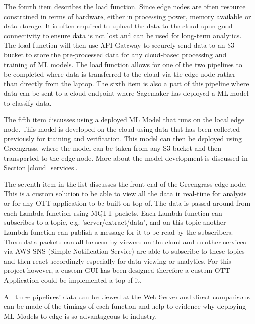 The fourth item describes the load function. Since edge nodes are often resource constrained in terms of hardware, either in processing power, memory available or data storage. It is often required to upload the data to the cloud upon good connectivity to ensure data is not lost and can be used for long-term analytics. The load function will then use API Gateway to securely send data to an S3 bucket to store the pre-processed data for any cloud-based processing and training of ML models. The load function allows for one of the two pipelines to be completed where data is transferred to the cloud via the edge node rather than directly from the laptop. The sixth item is also a part of this pipeline where data can be sent to a cloud endpoint where Sagemaker has deployed a ML model to classify data.

The fifth item discusses using a deployed ML Model that runs on the local edge node. This model is developed on the cloud using data that has been collected previously for training and verification. This model can then be deployed using Greengrass, where the model can be taken from any S3 bucket and then transported to the edge node. More about the model development is discussed in Section \ref{cloud_services}.

The seventh item in the list discusses the front-end of the Greengrass edge node. This is a custom solution to be able to view all the data in real-time for analysis or for any OTT application to be built on top of. The data is passed around from each Lambda function using MQTT packets. Each Lambda function can subscribes to a topic, e.g. 'server/extract/data', and on this topic another Lambda function can publish a message for it to be read by the subscribers. These data packets can all be seen by viewers on the cloud and so other services via AWS SNS (Simple Notification Service) are able to subscribe to these topics and then react accordingly especially for data viewing or analytics. For this project however, a custom GUI has been designed therefore a custom OTT Application could be implemented a top of it.

All three pipelines' data can be viewed at the Web Server and direct comparisons can be made of the timings of each function and help to evidence why deploying ML Models to edge is so advantageous to industry.

